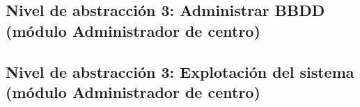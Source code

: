 \subsection{Nivel de abstracción 3: Administrar BBDD (módulo Administrador de centro)}



\subsection{Nivel de abstracción 3: Explotación del sistema (módulo Administrador de centro)}

